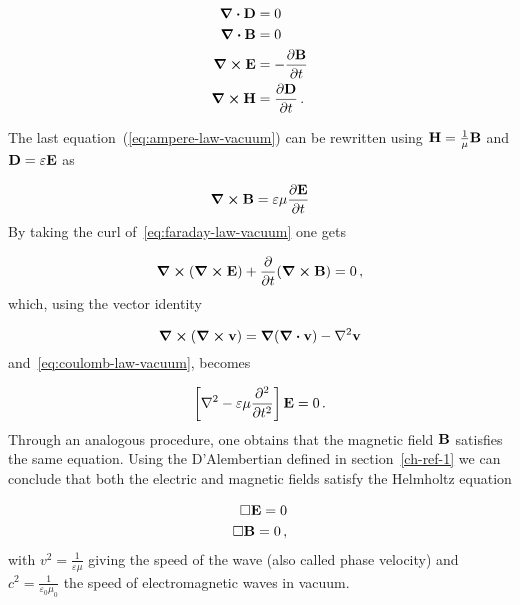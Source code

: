 \documentclass[12pt, class=report, crop=false]{standalone}
\begin{document}
\begin{subequations}
  \label{eq:maxwell-vacuum}
  \begin{align}
    \div{\vb{D}} & = 0
    \label{eq:coulomb-law-vacuum} \\
    \div{\vb{B}} & = 0
    \label{eq:gauss-law-vacuum} \\
    \curl{\vb{E}} & = - \pdv{\vb{B}}{t}
    \label{eq:faraday-law-vacuum} \\
    \curl{\vb{H}} & = \pdv{\vb{D}}{t}
    \label{eq:ampere-law-vacuum} \,.
  \end{align}
\end{subequations}

The last equation~(\ref{eq:ampere-law-vacuum}) can be rewritten using \(\vb{H}=\frac{1}{\mu} \vb{B}\) and \(\vb{D} = \varepsilon \vb{E}\) as

\begin{equation}
  \curl{\vb{B}} = \varepsilon \mu \pdv{\vb{E}}{t}
\end{equation}
By taking the curl of~\cref{eq:faraday-law-vacuum} one gets

\begin{equation*}
  \curl{(\curl{\vb{E}})} + \pdv{t} (\curl{\vb{B}}) = 0\,,
\end{equation*}
which, using the vector identity

\begin{equation}
  \label{id:curl-curl}
  \curl{(\curl{\vb{v}})} = \grad{(\div{\vb{v}})} - \laplacian{\vb{v}}
\end{equation}
and~\cref{eq:coulomb-law-vacuum}, becomes

\begin{equation}
  \left[ \laplacian{} - \varepsilon\mu \pdv[2]{t} \right] \vb{E} = 0 \,.
\end{equation}
Through an analogous procedure, one obtains that the magnetic field \(\vb{B}\) satisfies the same equation. Using the D'Alembertian defined in section~\ref{ch-ref-1} we can conclude that both the electric and magnetic fields satisfy the Helmholtz equation

\begin{subequations}
  \label{eq:helmhotz}
  \begin{align}
    \Box \vb{E} = 0 \\
    \Box \vb{B} = 0 \,,
  \end{align}
\end{subequations}
with \(v^2=\frac{1}{\varepsilon\mu}\) giving the speed of the wave (also called phase velocity) and \(c^2=\frac{1}{\varepsilon_0 \mu_0} \) the speed of electromagnetic waves in vacuum.
\end{document}
